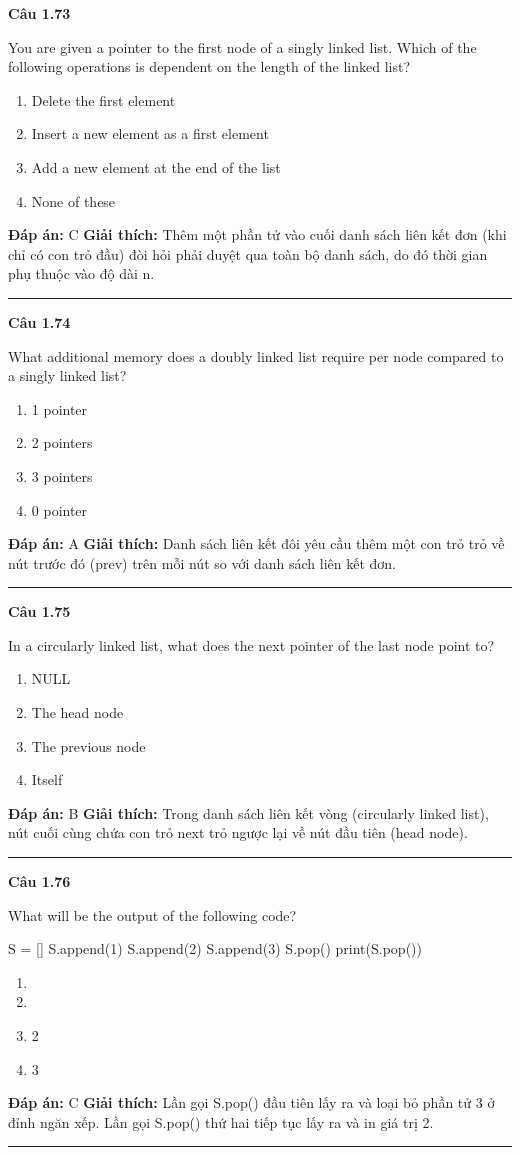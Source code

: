 \documentclass[11pt,a4paper]{article}
\newenvironment{question}[1]{%
  \par\vspace{1em}\noindent\textbf{\large Câu #1}\par\vspace{0.4em}
}{%
  \par\vspace{1em}\hrule\vspace{0.6em}
}
\newenvironment{choices}{%
  \begin{enumerate}[label=\textbf{\Alph*.},leftmargin=2.2em,itemsep=2pt,topsep=3pt]
}{%
  \end{enumerate}
}
\newcommand{\choice}{\item}
\newenvironment{codebox}{%
  \begin{tcolorbox}[colback=gray!8!white,colframe=gray!50!black,arc=1.5mm,boxrule=0.6pt,left=3mm,right=3mm,top=2.5mm,bottom=2.5mm]
  \ttfamily\small
}{%
  \end{tcolorbox}
}
\begin{document}
\begin{question}{1.73}
You are given a pointer to the first node of a singly linked list. Which of the following operations is dependent on the length of the linked list?
\begin{choices}
\choice Delete the first element
\choice Insert a new element as a first element
\choice Add a new element at the end of the list
\choice None of these
\end{choices}
\textbf{Đáp án:} C
\textbf{Giải thích:} Thêm một phần tử vào cuối danh sách liên kết đơn (khi chỉ có con trỏ đầu) đòi hỏi phải duyệt qua toàn bộ danh sách, do đó thời gian phụ thuộc vào độ dài n.
\end{question}

\begin{question}{1.74}
What additional memory does a doubly linked list require per node compared to a singly linked list?
\begin{choices}
\choice 1 pointer
\choice 2 pointers
\choice 3 pointers
\choice 0 pointer
\end{choices}
\textbf{Đáp án:} A
\textbf{Giải thích:} Danh sách liên kết đôi yêu cầu thêm một con trỏ trỏ về nút trước đó (prev) trên mỗi nút so với danh sách liên kết đơn.
\end{question}

\begin{question}{1.75}
In a circularly linked list, what does the next pointer of the last node point to?
\begin{choices}
\choice NULL
\choice The head node
\choice The previous node
\choice Itself
\end{choices}
\textbf{Đáp án:} B
\textbf{Giải thích:} Trong danh sách liên kết vòng (circularly linked list), nút cuối cùng chứa con trỏ next trỏ ngược lại về nút đầu tiên (head node).
\end{question}

\begin{question}{1.76}
What will be the output of the following code?
\begin{codebox}
S = []
S.append(1)
S.append(2)
S.append(3)
S.pop()
print(S.pop())
\end{codebox}
\begin{choices}
\choice [1, 2, 3]
\choice [1, 2]
\choice 2
\choice 3
\end{choices}
\textbf{Đáp án:} C
\textbf{Giải thích:} Lần gọi S.pop() đầu tiên lấy ra và loại bỏ phần tử 3 ở đỉnh ngăn xếp. Lần gọi S.pop() thứ hai tiếp tục lấy ra và in giá trị 2.
\end{question}
\end{document}
